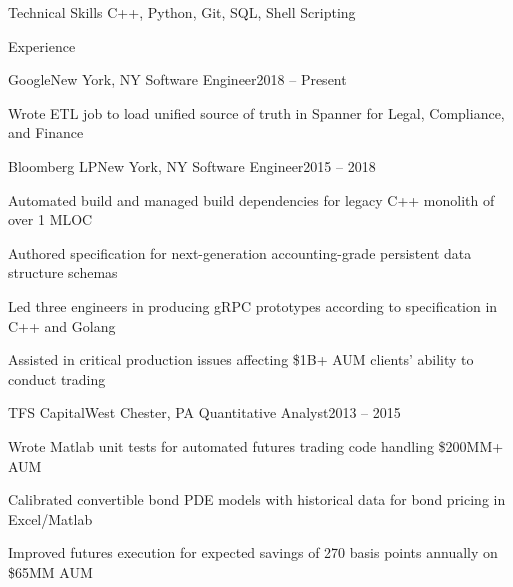 \documentclass{resume}
\begin{document}

\begin{rSection}{Technical Skills}
C++, Python, Git, SQL, Shell Scripting
\end{rSection}


\begin{rSection}{Experience}


\begin{rSubsection}{Google}{New York, NY}
{Software Engineer}{2018 -- Present}

\item Wrote ETL job to load unified source of truth
in Spanner for Legal, Compliance, and Finance

\end{rSubsection}

\begin{rSubsection}{Bloomberg LP}{New York, NY}
{Software Engineer}{2015 -- 2018}

\item Automated build and managed build dependencies for legacy
C++ monolith of over 1 MLOC
\item Authored specification for next-generation accounting-grade
persistent data structure schemas
\item Led three engineers in producing gRPC prototypes
according to specification in C++ and Golang
\item Assisted in critical production issues
affecting \$1B+ AUM clients' ability to conduct trading

\end{rSubsection}

\begin{rSubsection}{TFS Capital}{West Chester, PA}
{Quantitative Analyst}{2013 -- 2015}

\item Wrote Matlab unit tests for
automated futures trading code handling \$200MM+ AUM
\item Calibrated convertible bond PDE models with historical
data for bond pricing in Excel\slash Matlab
\item Improved futures execution for expected savings of
270 basis points annually on \$65MM AUM


\end{rSubsection}
\end{rSection}
\end{document}
